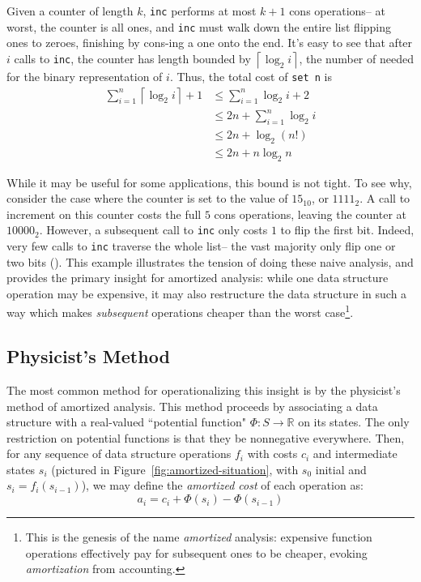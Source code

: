\documentclass[draft]{westhesis}
\begin{document}
Given a counter of length $k$, \texttt{inc} performs at most $k + 1$ cons operations-- at worst, the counter is all ones, and \texttt{inc} must walk down the entire list flipping ones to zeroes, finishing by cons-ing a one onto the end. It's easy to see that after $i$ calls to \texttt{inc}, the counter has length bounded by $\left \lceil{\log_2 i}\right \rceil$, the number of needed for the binary representation of $i$. Thus, the total cost of \texttt{set n} is
\begin{align*}
  \sum_{i=1}^n \left\lceil{\log_2 i}\right \rceil + 1
  &\leq \sum_{i=1}^n \log_2 i + 2\\
  &\leq 2n + \sum_{i=1}^n \log_2 i\\
  &\leq 2n + \log_2(n!)\\
  &\leq 2n + n\log_2 n
\end{align*}

While it may be useful for some applications, this bound is not tight. To see why, consider the case where the counter is set to the value of $15_{10}$, or $1111_2$. A  call to increment on this counter costs the full $5$ cons operations, leaving the counter at $10000_2$. However, a subsequent call to \texttt{inc} only costs $1$ to flip the first bit. Indeed, very few calls to \texttt{inc} traverse the whole list-- the vast majority only flip one or two bits (). This example illustrates the tension of doing these naive analysis, and provides the primary insight for amortized analysis: while one data structure operation may be expensive, it may also restructure the data structure in such a way which makes \textit{subsequent} operations cheaper than the worst case\footnote{
This is the genesis of the name \textit{amortized} analysis: expensive function operations effectively pay for subsequent ones to be cheaper, evoking \textit{amortization} from accounting.
}.

\subsection{Physicist's Method}
The most common method for operationalizing this insight is by the physicist's method of amortized analysis. This method proceeds by associating a data structure with a real-valued ``potential function" $\Phi : S \to \mathbb{R}$ on its states. The only restriction on potential functions is that they be nonnegative everywhere.
Then, for any sequence of data structure operations $f_i$ with costs $c_i$ and intermediate states $s_i$ (pictured in Figure~\ref{fig:amortized-situation}, with $s_0$ initial and $s_i = f_i(s_{i-1})$), we may define the \textit{amortized cost} of each operation as:
$$
a_i = c_i + \Phi(s_i) - \Phi(s_{i-1})
$$
\end{document}
